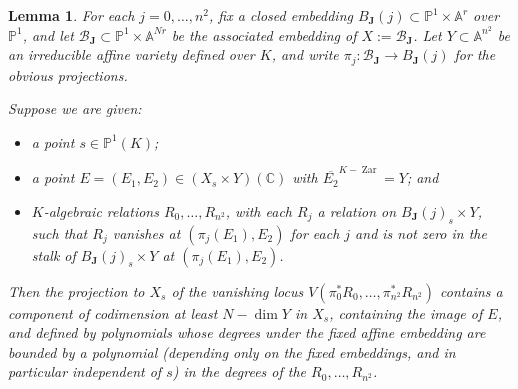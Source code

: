 \documentclass[10pt]{article}
\numberwithin{equation}{section}
\theoremstyle{plain}
\newtheorem{lem}[thm]{Lemma}
\theoremstyle{definition}
\theoremstyle{remark}
\begin{document}
\begin{lem}
\label{deeplemma}
For each $j = 0, \hdots, n^2$, fix a closed embedding $B_{\mathbf{J}}(j) \subset \mathbb{P}^1 \times \mathbb{A}^{r}$ over $\mathbb{P}^1$, and let $\mathcal{B}_{\mathbf{J}} \subset \mathbb{P}^1 \times \mathbb{A}^{Nr}$ be the associated embedding of $X := \mathcal{B}_{\mathbf{J}}$. Let $Y \subset \mathbb{A}^{n^2}$ be an irreducible affine variety defined over $K$, and write $\pi_{j} : \mathcal{B}_{\mathbf{J}} \to B_{\mathbf{J}}(j)$ for the obvious projections.


Suppose we are given: 
\begin{itemize}
    \item a point $s \in \mathbb{P}^1(K)$;
    \item a point $E = (E_{1}, E_{2}) \in (X_{s} \times Y)(\mathbb{C})$ with $\overline{E_{2}}^{K-\operatorname{Zar}} = Y$; and
    \item $K$-algebraic relations $R_{0}, \hdots, R_{n^2}$, with each $R_{j}$ a relation on $B_{\mathbf{J}}(j)_{s} \times Y$, such that $R_{j}$ vanishes at $(\pi_{j}(E_{1}), E_{2})$ for each $j$ and is not zero in the stalk of $B_{\mathbf{J}}(j)_{s} \times Y$ at $(\pi_{j}(E_{1}), E_{2})$.
\end{itemize}
Then the projection to $X_{s}$ of the vanishing locus $V(\pi_{0}^{*} R_{0}, \hdots, \pi^{*}_{n^2} R_{n^2})$ contains a component of codimension at least $N - \dim Y$ in $X_{s}$, containing the image of $E$, and defined by polynomials whose degrees under the fixed affine embedding are bounded by a polynomial (depending only on the fixed embeddings, and in particular independent of $s$) in the degrees of the $R_{0}, \hdots, R_{n^2}$.
\end{lem}
\end{document}

